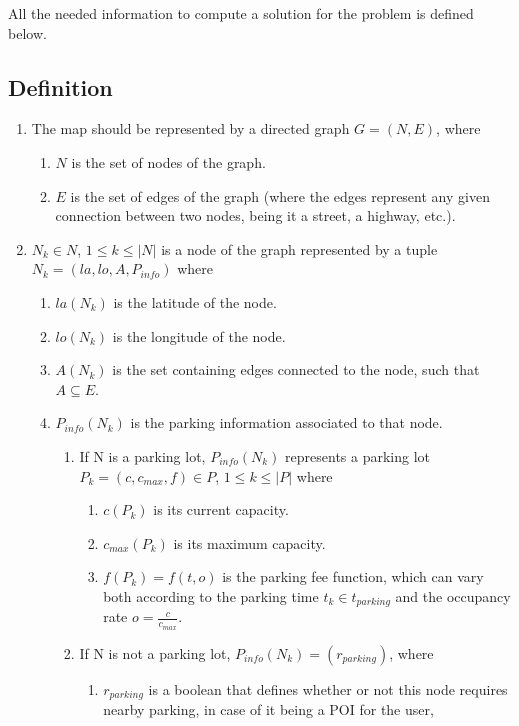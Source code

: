 \documentclass[a4paper, 12pt]{report}
\begin{document}
    All the needed information to compute a solution for the problem is defined below.
    \subsection{Definition}
    
    \begin{enumerate}
        \item The map should be represented by a directed graph $G = (N,E)$, where
        \begin{enumerate}
            \item $N$ is the set of nodes of the graph.
            \item $E$ is the set of edges of the graph (where the edges represent any given connection between two nodes, being it a street, a highway, etc.).
        \end{enumerate}
    
        \item $N_{k} \in N$, $1 \leqslant k \leqslant |N|$ is a node of the graph represented by a tuple $N_k = (la, lo, A, P_{info})$ where
        \begin{enumerate}
            \item $la(N_k)$ is the latitude of the node.
            \item $lo(N_k)$ is the longitude of the node. 
            \item $A(N_k)$ is the set containing edges connected to the node, such that $A \subseteq E$.
            \item $P_{info}(N_k)$ is the parking information associated to that node.
            \begin{enumerate}
                \item If N is a parking lot, $P_{info}(N_k)$ represents a parking lot $P_k = (c,c_{max},f) \in P$, $1 \leqslant k \leqslant |P|$  where
                \begin{enumerate}
                    \item $c(P_k)$ is its current capacity.
                    \item $c_{max}(P_k)$ is its maximum capacity.
                    \item $f(P_k) = f(t,o)$ is the parking fee function, which can vary both according to the parking time $t_k \in t_{parking}$ and the occupancy rate $o = \frac{c}{c_{max}}$.
                \end{enumerate}
                \item If N is not a parking lot, $P_{info}(N_k) = (r_{parking})$, where
                \begin{enumerate}
                    \item $r_{parking}$ is a boolean that defines whether or not this node requires nearby parking, in case of it being a POI for the user, 
                \end{enumerate}
            \end{enumerate}
        \end{enumerate}
        

\end{enumerate}
\end{document}
